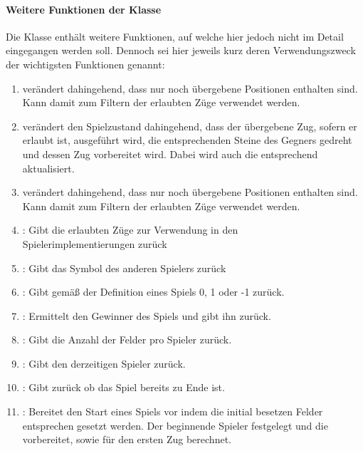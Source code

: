 \paragraph{Weitere Funktionen der Klasse }
Die Klasse  enthält weitere Funktionen, auf welche hier jedoch nicht im Detail eingegangen werden soll. Dennoch sei hier jeweils kurz deren Verwendungszweck der wichtigsten Funktionen genannt:
\begin{enumerate}
\item {} verändert  dahingehend, dass nur noch übergebene Positionen enthalten sind. Kann damit zum Filtern der erlaubten Züge verwendet werden.
\item {} verändert den Spielzustand dahingehend, dass der übergebene Zug, sofern er erlaubt ist, ausgeführt wird, die entsprechenden Steine des Gegners gedreht und dessen Zug vorbereitet wird. Dabei wird auch die  entsprechend aktualisiert.
\item {} verändert  dahingehend, dass nur noch übergebene Positionen enthalten sind. Kann damit zum Filtern der erlaubten Züge verwendet werden.
\item {}: Gibt die erlaubten Züge zur Verwendung in den \\Spielerimplementierungen zurück
\item {}: Gibt das Symbol des anderen Spielers zurück
\item {}: Gibt gemäß der Definition eines Spiels 0, 1 oder -1 zurück.
\item {}: Ermittelt den Gewinner des Spiels und gibt ihn zurück.
\item {}: Gibt die Anzahl der Felder pro Spieler zurück.
\item {}: Gibt den derzeitigen Spieler zurück.
\item {}: Gibt zurück ob das Spiel bereits zu Ende ist.
\item {}: Bereitet den Start eines Spiels vor indem die initial besetzen Felder entsprechen gesetzt werden. Der beginnende Spieler festgelegt und die   vorbereitet, sowie  für den ersten Zug berechnet.
\end{enumerate}
